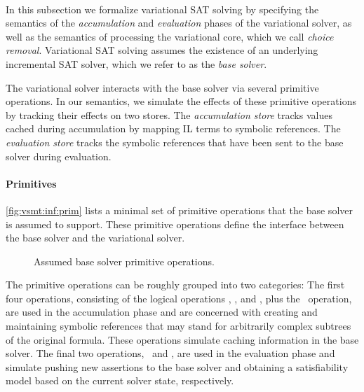 ~\label{section:formalization}


In this subsection we formalize variational SAT solving by specifying the
semantics of the \emph{accumulation} and \emph{evaluation} phases of the
variational solver, as well as the semantics of processing the variational
core, which we call \emph{choice removal}.
%
Variational SAT solving assumes the existence of an underlying incremental SAT
solver, which we refer to as the \emph{base solver}.


The variational solver interacts with the base solver via several primitive
operations. In our semantics, we simulate the effects of these primitive
operations by tracking their effects on two stores.
%
The \emph{accumulation store} \aStore{} tracks values cached during
accumulation by mapping IL terms to symbolic references. The \emph{evaluation
store} \eStore{} tracks the symbolic references that have been sent to the base
solver during evaluation.




\paragraph{Primitives}
%
\autoref{fig:vsmt:inf:prim} lists a minimal set of primitive operations that
the base solver is assumed to support. These primitive operations define the
interface between the base solver and the variational solver.


\begin{figure}
  
  \caption{Assumed base solver primitive operations.}%
  \label{fig:vsmt:inf:prim}
\end{figure}


The primitive operations can be roughly grouped into two categories:
%
The first four operations, consisting of the logical operations \pnot, \pand,
and \por, plus the \pspawn\ operation, are used in the accumulation phase and
are concerned with creating and maintaining symbolic references that may stand
for arbitrarily complex subtrees of the original formula. These operations
simulate caching information in the base solver.
%
The final two operations, \passert\ and \pmodel, are used in the evaluation
phase and simulate pushing new assertions to the base solver and obtaining a
satisfiability model based on the current solver state, respectively.


